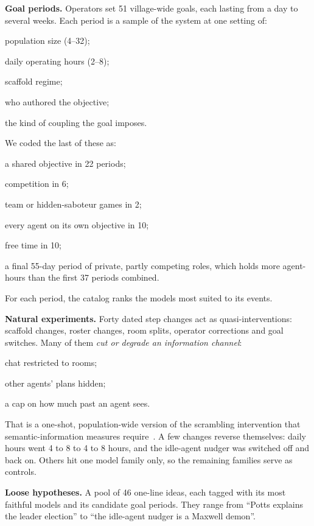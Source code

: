 \documentclass[reprint,aps,pre,10pt,superscriptaddress,nofootinbib]{revtex4-2}
\newenvironment{tight}{\begin{list}{\textbullet}{\setlength{\itemsep}{0pt}\setlength{\parsep}{0pt}\setlength{\topsep}{2pt}\setlength{\partopsep}{0pt}\setlength{\leftmargin}{1.1em}\setlength{\labelwidth}{0.6em}\setlength{\labelsep}{0.4em}}}{\end{list}}
\begin{document}
\textbf{Goal periods.} Operators set 51 village-wide goals, each lasting from a day to several weeks. Each period is a sample of the system at one setting of:
\begin{tight}
\item population size (4--32);
\item daily operating hours (2--8);
\item scaffold regime;
\item who authored the objective;
\item the kind of coupling the goal imposes.
\end{tight}
We coded the last of these as:
\begin{tight}
\item a shared objective in 22 periods;
\item competition in 6;
\item team or hidden-saboteur games in 2;
\item every agent on its own objective in 10;
\item free time in 10;
\item a final 55-day period of private, partly competing roles, which holds more agent-hours than the first 37 periods combined.
\end{tight}
For each period, the catalog ranks the models most suited to its events.

\textbf{Natural experiments.} Forty dated step changes act as quasi-interventions: scaffold changes, roster changes, room splits, operator corrections and goal switches. Many of them \emph{cut or degrade an information channel}:
\begin{tight}
\item chat restricted to rooms;
\item other agents' plans hidden;
\item a cap on how much past an agent sees.
\end{tight}
That is a one-shot, population-wide version of the scrambling intervention that semantic-information measures require~\cite{kolchinsky2018}. A few changes reverse themselves: daily hours went 4 to 8 to 4 to 8 hours, and the idle-agent nudger was switched off and back on. Others hit one model family only, so the remaining families serve as controls.

\textbf{Loose hypotheses.} A pool of 46 one-line ideas, each tagged with its most faithful models and its candidate goal periods. They range from ``Potts explains the leader election'' to ``the idle-agent nudger is a Maxwell demon''.
\end{document}
